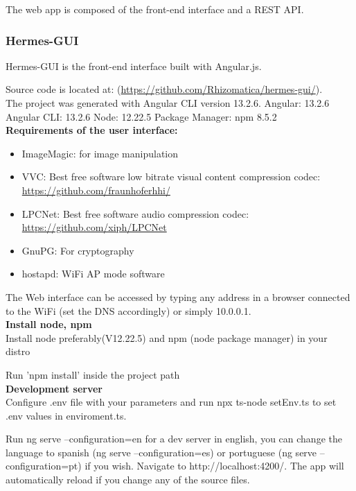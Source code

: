 \documentclass[11pt,a4paper]{article}
\begin{document}
The web app is composed of the front-end interface and a REST API.

\subsubsection{Hermes-GUI}
Hermes-GUI is the front-end interface built with Angular.js.

Source code is located at:
(\url{https://github.com/Rhizomatica/hermes-gui/}).\\

The project was generated with Angular CLI version 13.2.6.
Angular: 13.2.6 Angular CLI: 13.2.6 Node: 12.22.5 Package Manager: npm 8.5.2\\

\textbf{Requirements of the user interface:}

\begin{itemize}
\item ImageMagic: for image manipulation
\item VVC: Best free software low bitrate visual content compression codec: \url{https://github.com/fraunhoferhhi/}
\item LPCNet: Best free software audio compression codec: \url{https://github.com/xiph/LPCNet}
\item GnuPG: For cryptography
\item hostapd: WiFi AP mode software
\end{itemize}

The Web interface can be accessed by typing any address in a browser
connected to the WiFi (set the DNS accordingly) or simply 10.0.0.1.\\


\textbf{Install node, npm}\\
Install node preferably(V12.22.5) and npm (node package manager) in your distro

Run 'npm install' inside the project path\\

\textbf{Development server}\\
Configure .env file with your parameters and run npx ts-node setEnv.ts to set .env values in enviroment.ts.

Run ng serve --configuration=en for a dev server in english, you can change the language to spanish (ng serve --configuration=es) or portuguese (ng serve --configuration=pt) if you wish. Navigate to http://localhost:4200/. The app will automatically reload if you change any of the source files.\\
\end{document}
